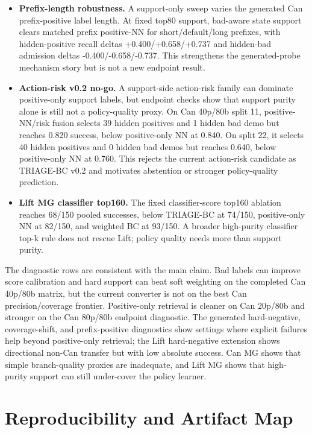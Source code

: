 \documentclass[11pt]{article}
\newcommand{\method}{TRIAGE-BC}
\begin{document}
\begin{itemize}[leftmargin=*]
  \item \textbf{Prefix-length robustness.} A support-only sweep varies the generated Can prefix-positive label length. At fixed top80 support, bad-aware state support clears matched prefix positive-NN for short/default/long prefixes, with hidden-positive recall deltas +0.400/+0.658/+0.737 and hidden-bad admission deltas -0.400/-0.658/-0.737. This strengthens the generated-probe mechanism story but is not a new endpoint result.
  \item \textbf{Action-risk v0.2 no-go.} A support-side action-risk family can dominate positive-only support labels, but endpoint checks show that support purity alone is still not a policy-quality proxy. On Can 40p/80b split 11, positive-NN/risk fusion selects 39 hidden positives and 1 hidden bad demo but reaches 0.820 success, below positive-only NN at 0.840. On split 22, it selects 40 hidden positives and 0 hidden bad demos but reaches 0.640, below positive-only NN at 0.760. This rejects the current action-risk candidate as \method{} v0.2 and motivates abstention or stronger policy-quality prediction.
  \item \textbf{Lift MG classifier top160.} The fixed classifier-score top160 ablation reaches 68/150 pooled successes, below \method{} at 74/150, positive-only NN at 82/150, and weighted BC at 93/150. A broader high-purity classifier top-k rule does not rescue Lift; policy quality needs more than support purity.
\end{itemize}

The diagnostic rows are consistent with the main claim. Bad labels can improve score calibration and hard support can beat soft weighting on the completed Can 40p/80b matrix, but the current converter is not on the best Can precision/coverage frontier. Positive-only retrieval is cleaner on Can 20p/80b and stronger on the Can 80p/80b endpoint diagnostic. The generated hard-negative, coverage-shift, and prefix-positive diagnostics show settings where explicit failures help beyond positive-only retrieval; the Lift hard-negative extension shows directional non-Can transfer but with low absolute success. Can MG shows that simple branch-quality proxies are inadequate, and Lift MG shows that high-purity support can still under-cover the policy learner.

\section{Reproducibility and Artifact Map}
\end{document}
